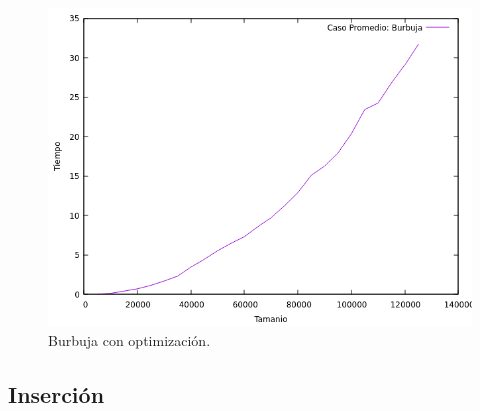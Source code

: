 \documentclass[a4paper,12pt,twoside]{article} %
\begin{document}
\begin{itemize}
\begin{figure}[h]
\begin{center}
  	\includegraphics[scale=0.8]{burbuja_me_co.png}
  	\caption{Burbuja con optimización.}
  	
  \end{center}
\end{figure}

\newpage
	
\end{itemize}
	
	
	\subsection{Inserción}
	
\end{document}
